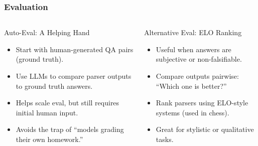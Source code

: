 \begin{frame}[fragile]\frametitle{Evaluation}

\begin{columns}
    \begin{column}[T]{0.5\linewidth}
	Auto-Eval: A Helping Hand
	  \begin{itemize}
		\item Start with human-generated QA pairs (ground truth).
		\item Use LLMs to compare parser outputs to ground truth answers.
		\item Helps scale eval, but still requires initial human input.
		\item Avoids the trap of ``models grading their own homework.''
	  \end{itemize}
     
    \end{column}
    \begin{column}[T]{0.5\linewidth}  
	
	Alternative Eval: ELO Ranking
	  \begin{itemize}
		\item Useful when answers are subjective or non-falsifiable.
		\item Compare outputs pairwise: ``Which one is better?''
		\item Rank parsers using ELO-style systems (used in chess).
		\item Great for stylistic or qualitative tasks.
	  \end{itemize}
    \end{column}
  \end{columns}    
\end{frame}

